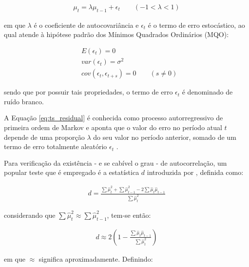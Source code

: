 \begin{ceqn}
\begin{align} \label{eq:ts_residual}
\mu_{t} = \lambda \mu_{t-1} + \epsilon_{t} \qquad (-1 < \lambda < 1)
\end{align}
\end{ceqn} em que $\lambda$ é o coeficiente de autocovariância e $\epsilon_{t}$ é o termo de erro estocástico, ao qual atende à hipótese padrão dos Mínimos Quadrados Ordinários (MQO):

\begin{ceqn}
\begin{align} \label{eq:ts_error_white_noise}
&E(\epsilon_{t}) = 0 \nonumber \\
&var(\epsilon_{t}) = \sigma^2 \\
&cov(\epsilon_{t}, \epsilon_{t+s}) = 0 \qquad (s \neq 0) \nonumber
\end{align}
\end{ceqn} sendo que por possuir tais propriedades, o termo de erro $\epsilon_{t}$ é denominado de ruído branco.

A Equação \eqref{eq:ts_residual} é conhecida como processo autorregressivo de primeira ordem de Markov e aponta que o valor do erro no período atual $t$ depende de uma proporção $\lambda$ do seu valor no período anterior, somado de um termo de erro totalmente aleatório $\epsilon_{t}$ \cite{gujarati_ecn2011}.


Para verificação da existência - e se cabível o grau - de autocorrelação, um popular teste que é empregado é a estatística $d$ introduzida por , definida como:

\begin{ceqn}
\begin{align} \label{eq:durbin_watson}
d = \frac{\sum{\hat{\mu}_{t}^2} + \sum{\hat{\mu}_{t-1}^2} - 2 \sum{\hat{\mu}_{t} \hat{\mu}_{t-1}}}{\sum{\hat{\mu}_{t}^2}} 
\end{align}
\end{ceqn} considerando que $\sum{\hat{\mu}_{t}^2} \approx \sum{\hat{\mu}_{t-1}^2}$, tem-se então:

\begin{ceqn}
\begin{align} \label{eq:durbin_watson_2}
d \approx 2 \left( 1 - \frac{\sum{\hat{\mu}_{t} \hat{\mu}_{t-1}}}{\sum{\hat{\mu}_{t}^2}} \right)
\end{align}
\end{ceqn} em que $\approx$ significa aproximadamente. Definindo:

